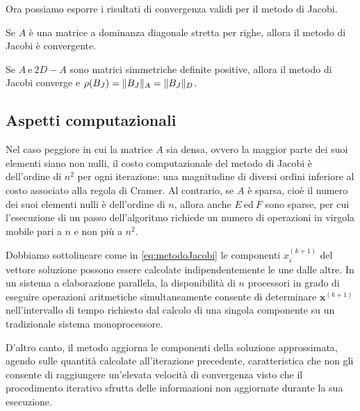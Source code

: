Ora possiamo esporre i risultati di convergenza validi per il metodo di Jacobi.
\begin{teorema}
    Se $A$ \`e una matrice a dominanza diagonale stretta per righe, allora il metodo di Jacobi \`e convergente.
\end{teorema}
\begin{teorema}
    Se $A \ \text{e} \ 2D - A$ sono matrici simmetriche definite positive, allora il metodo di Jacobi converge e $\rho(B_{J}) = \lVert B_{J}\rVert_{A} = \lVert B_{J}\rVert_{D}$.
\end{teorema}
\subsection{Aspetti computazionali}
\nocite{BiniAnalisiNumerica2013}
Nel caso peggiore in cui la matrice $A$ sia densa, ovvero la maggior parte dei suoi elementi siano non nulli,
il costo computazionale del metodo di Jacobi \`e dell'ordine di $n^{2}$ \si{\flops} per ogni iterazione: una magnitudine di diversi ordini inferiore
al costo associato alla regola di Cramer.\newline
Al contrario, se $A$ \`e sparsa, cio\`e il numero dei suoi elementi nulli \`e dell'ordine di $n$, allora anche $E \ \text{ed} \ F$ 
sono sparse, per cui l'esecuzione di un passo dell'algoritmo richiede un numero di operazioni in virgola mobile pari a $n$ e non 
pi\`u a $n^2$.

Dobbiamo sottolineare come in \eqref{eq:metodoJacobi} le componenti $x_{i}^{(k+1)}$ del vettore soluzione possono essere calcolate indipendentemente le une dalle altre. \newline 
In un sistema a elaborazione parallela, la disponibilit\`a di $n$ processori in grado di eseguire operazioni aritmetiche simultaneamente consente di determinare $\mathbf{x}^{(k+1)}$ nell'intervallo di tempo richiesto dal calcolo di una singola componente su un tradizionale sistema monoprocessore.

D'altro canto, il metodo aggiorna le componenti della soluzione approssimata, agendo sulle quantit\`a calcolate all'iterazione precedente, caratteristica che non gli consente di raggiungere un'elevata velocit\`a di convergenza visto che il procedimento iterativo sfrutta delle informazioni non aggiornate durante la sua esecuzione.

